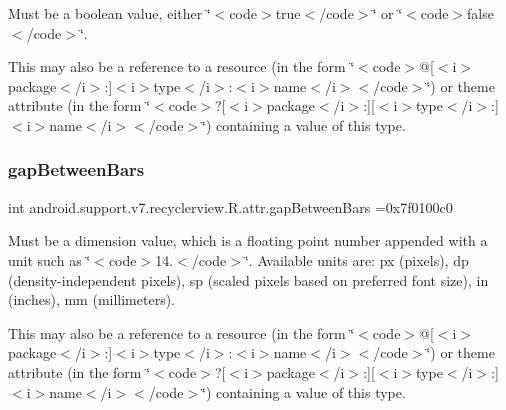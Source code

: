 Must be a boolean value, either \char`\"{}$<$code$>$true$<$/code$>$\char`\"{} or \char`\"{}$<$code$>$false$<$/code$>$\char`\"{}. 

This may also be a reference to a resource (in the form \char`\"{}$<$code$>$@\mbox{[}$<$i$>$package$<$/i$>$\+:\mbox{]}$<$i$>$type$<$/i$>$\+:$<$i$>$name$<$/i$>$$<$/code$>$\char`\"{}) or theme attribute (in the form \char`\"{}$<$code$>$?\mbox{[}$<$i$>$package$<$/i$>$\+:\mbox{]}\mbox{[}$<$i$>$type$<$/i$>$\+:\mbox{]}$<$i$>$name$<$/i$>$$<$/code$>$\char`\"{}) containing a value of this type. \mbox{\label{classandroid_1_1support_1_1v7_1_1recyclerview_1_1R_1_1attr_a4177afe3f0acaf9debb61a815bf22244}} 
\subsubsection{\texorpdfstring{gap\+Between\+Bars}{gapBetweenBars}}
{\footnotesize\ttfamily int android.\+support.\+v7.\+recyclerview.\+R.\+attr.\+gap\+Between\+Bars =0x7f0100c0\hspace{0.3cm}{\ttfamily [static]}}

Must be a dimension value, which is a floating point number appended with a unit such as \char`\"{}$<$code$>$14.\+5sp$<$/code$>$\char`\"{}. Available units are\+: px (pixels), dp (density-\/independent pixels), sp (scaled pixels based on preferred font size), in (inches), mm (millimeters). 

This may also be a reference to a resource (in the form \char`\"{}$<$code$>$@\mbox{[}$<$i$>$package$<$/i$>$\+:\mbox{]}$<$i$>$type$<$/i$>$\+:$<$i$>$name$<$/i$>$$<$/code$>$\char`\"{}) or theme attribute (in the form \char`\"{}$<$code$>$?\mbox{[}$<$i$>$package$<$/i$>$\+:\mbox{]}\mbox{[}$<$i$>$type$<$/i$>$\+:\mbox{]}$<$i$>$name$<$/i$>$$<$/code$>$\char`\"{}) containing a value of this type. \mbox{\label{classandroid_1_1support_1_1v7_1_1recyclerview_1_1R_1_1attr_ab30e3d6a619b19f402b5b97c938065aa}} 
